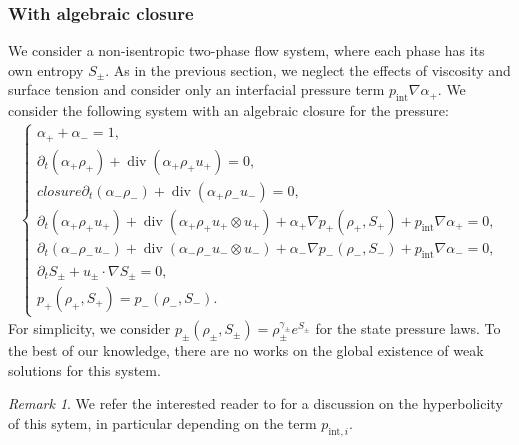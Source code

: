 \documentclass[11pt, twoside, a4paper]{article}
\theoremstyle{plain}
\theoremstyle{remark}
\newtheorem{remark}[theorem]{Remark}
\numberwithin{equation}{section}
\renewcommand{\div}{\operatorname{div}}
\newcommand{\dt}{\partial_t}
\newcommand{\ap}{\alpha_+}
\newcommand{\am}{\alpha_-}
\newcommand{\rp}{\rho_+}
\newcommand{\rmi}{\rho_-}
\begin{document}
\subsubsection{With algebraic closure}

We consider a non-isentropic two-phase flow system, where each phase has its own entropy $S_\pm$. As in the previous section, we neglect the effects of viscosity and surface tension and consider only an interfacial pressure term $p_{\mathrm{int}} \nabla \ap$. We consider the following system with an algebraic closure for the pressure:
\begin{align*}
    \left\{
        \begin{array}{l}
            \ap + \am = 1,\\
            \dt (\ap \rp) + \div(\ap \rp u_+) = 0,\\closure
            \dt (\am \rmi) + \div(\ap \rmi u_-) = 0,\\
            \dt (\ap \rp u_+) + \div (\ap \rp u_+ \otimes u_+) + \ap \nabla p_+(\rp, S_+) + p_{\mathrm{int}} \nabla \ap = 0,\\
            \dt (\am \rmi u_-) + \div (\am \rmi u_- \otimes u_-) + \am \nabla p_-(\rmi, S_-) + p_{\mathrm{int}} \nabla \am = 0,\\
            \dt S_\pm + u_\pm \cdot \nabla S_\pm = 0,\\
            p_+(\rp,S_+)=p_-(\rmi,S_-).
        \end{array}
    \right.
\end{align*}
For simplicity, we consider $p_\pm(\rho_\pm,S_\pm) = \rho_\pm^{\gamma_\pm}e^{S_\pm}$ for the state pressure laws. To the best of our knowledge, there are no works on the global existence of weak solutions for this system.

\begin{remark}
We refer the interested reader to \cite{ndjinga2007influence} for a discussion on the hyperbolicity of this sytem, in particular depending on the term $p_{\mathrm{int},i}$.\newline
\end{remark}
\end{document}
